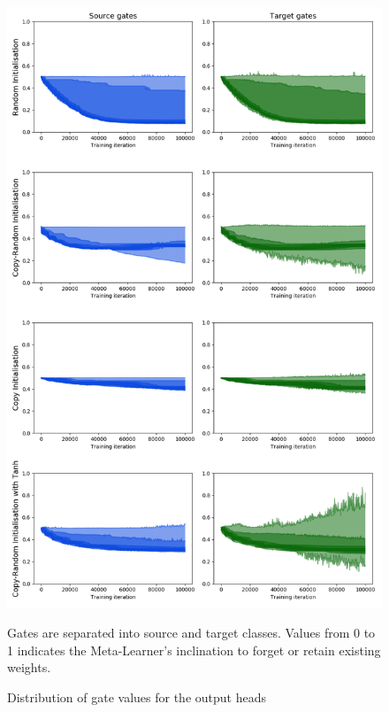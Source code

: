 \documentclass{report}
\begin{document}
\begin{figure}[!h]
	\centering
	\includegraphics[width=14cm]{gate-distrib}
	\caption{Distribution of gate values for the output heads}
	Gates are separated into source and target classes. Values from 0 to 1 indicates the Meta-Learner's inclination to forget or retain existing weights.
	\label{fig:gate-distrib:1}
\end{figure}
\end{document}

